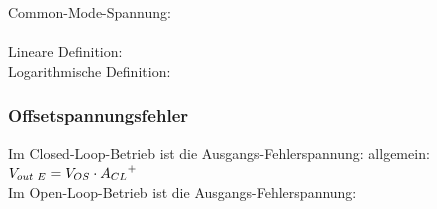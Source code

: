 			\begin{minipage}{18cm}
            	Common-Mode-Spannung:
            	\\
            	\hspace*{4.2cm}\\
            	Lineare Definition: \hspace{11mm}
            	\hspace{11mm}
            	\\
            	Logarithmische Definition:
            	\\
            \end{minipage}
		
		\subsubsection{Offsetspannungsfehler }
			\begin{minipage}{18cm}
            	Im Closed-Loop-Betrieb ist die Ausgangs-Fehlerspannung:\hspace{6mm}
            	 allgemein: $V_{out \hspace{1mm}E}=V_{OS}
            	\cdot {A_{CL}}^{+}$\\
            	Im Open-Loop-Betrieb ist die Ausgangs-Fehlerspannung:\hspace{6mm}
            	\\
            \end{minipage}
		
